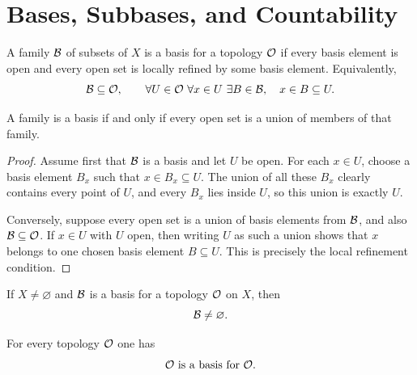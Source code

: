 \chapter{Bases, Subbases, and Countability}

\begin{definition}\label{def:topological-basis-3-1}
\leanok
A family $\mathcal{B}$ of subsets of $X$ is a basis for a topology $\mathcal{O}$ if every basis element is open and every open set is locally refined by some basis element.
Equivalently,
\[
\mathcal{B}\subseteq\mathcal{O},
\qquad
\forall U\in\mathcal{O}\ \forall x\in U\ \exists B\in\mathcal{B},
\quad x\in B\subseteq U.
\]
\end{definition}

\begin{proposition}\label{prop:basis-union-3-2}
\leanok
A family is a basis if and only if every open set is a union of members of that family.
\begin{proof}
Assume first that $\mathcal{B}$ is a basis and let $U$ be open. For each $x\in U$, choose a basis element $B_x$ such that $x\in B_x\subseteq U$. The union of all these $B_x$ clearly contains every point of $U$, and every $B_x$ lies inside $U$, so this union is exactly $U$.

Conversely, suppose every open set is a union of basis elements from $\mathcal{B}$, and also $\mathcal{B}\subseteq\mathcal{O}$. If $x\in U$ with $U$ open, then writing $U$ as such a union shows that $x$ belongs to one chosen basis element $B\subseteq U$. This is precisely the local refinement condition.
\end{proof}
\end{proposition}

\begin{proposition}\label{prop:basis-nonempty-3-2a}
\leanok
If $X\neq\varnothing$ and $\mathcal{B}$ is a basis for a topology $\mathcal{O}$ on $X$, then
\[
\mathcal{B} \neq \varnothing.
\]
\end{proposition}

\begin{example}\label{ex:all-open-basis-3-3}
\leanok
For every topology $\mathcal{O}$ one has
\[
\mathcal{O} \text{ is a basis for } \mathcal{O}.
\]
\end{example}


